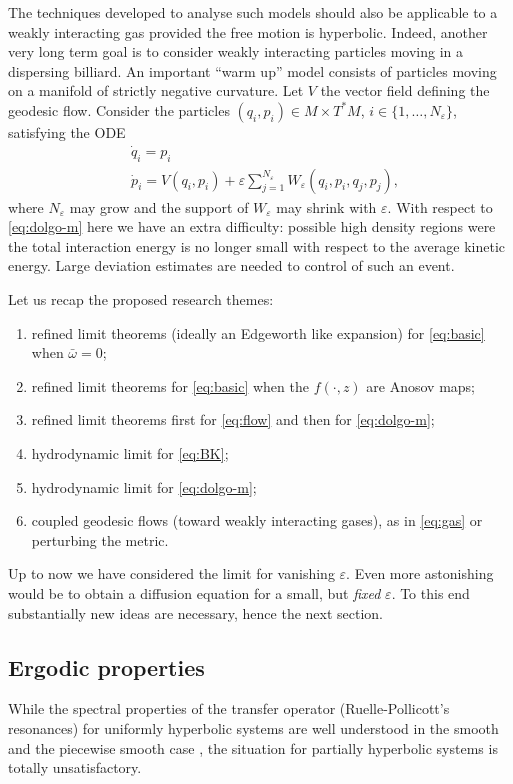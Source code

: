 \documentclass[10pt, a4paper, reqno]{amsart}
\newcommand\ve{\varepsilon}
\begin{document}
The techniques developed to analyse such models should also be applicable to a weakly interacting gas provided the free motion is hyperbolic. Indeed, another very long term goal is to consider weakly interacting particles moving in a dispersing billiard.  An important ``warm up'' model consists of particles moving on a manifold of strictly negative curvature. Let $V$ the vector field defining the geodesic flow. Consider the particles $(q_i, p_i)\in M\times T^*M$, $i\in\{1,\dots,N_\ve\}$,  satisfying the ODE
\begin{equation}\label{eq:gas}
\begin{split}
&\dot q_i=p_i\\
&\dot p_i=V(q_i, p_i)+\ve\sum_{j=1}^{N_\ve} W_\ve(q_i,p_i,q_j,p_j),
\end{split}
\end{equation}
where $N_\ve$ may grow and the support of $W_\ve$ may shrink with $\ve$.
With respect to \eqref{eq:dolgo-m} here we have an extra difficulty: possible high density regions were the total interaction energy is no longer small with respect to the average kinetic energy. Large deviation estimates are needed to control of such an event.

Let us recap the proposed research themes:
\begin{enumerate}
\item refined limit theorems (ideally an Edgeworth like expansion) for \eqref{eq:basic} when $\bar\omega=0$;
\item refined limit theorems for \eqref{eq:basic} when the $f(\cdot,z)$ are Anosov maps;
\item refined limit theorems first for \eqref{eq:flow} and then for \eqref{eq:dolgo-m};
\item hydrodynamic limit for \eqref{eq:BK};
\item hydrodynamic limit for \eqref{eq:dolgo-m};
\item coupled geodesic flows (toward weakly interacting gases), as in \eqref{eq:gas} or perturbing the metric.
\end{enumerate}
Up to now we have considered the limit for vanishing $\ve$.  Even more astonishing would be to obtain a diffusion equation for a small, but {\em fixed} $\ve$. To this end substantially new ideas are necessary, hence the next section.

\subsection{Ergodic properties}\label{sec:2funct}
While the spectral properties of the transfer operator (Ruelle-Pollicott's resonances) for uniformly hyperbolic systems are well understood in the smooth \cite{GL06, BT07} and the piecewise smooth case \cite{DL08, DZ13}, the situation for partially hyperbolic systems is totally unsatisfactory. 
\end{document}
